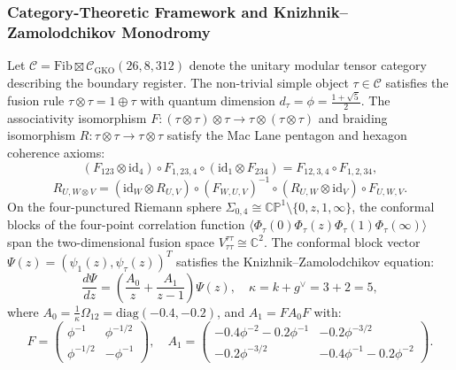 \documentclass[11pt,onecolumn]{article}
\begin{document}
\subsubsection{Category-Theoretic Framework and Knizhnik--Zamolodchikov Monodromy}
Let $\mathcal{C} = \text{Fib} \boxtimes \mathcal{C}_{\text{GKO}}(26, 8, 312)$ denote the unitary modular tensor category describing the boundary register. The non-trivial simple object $\tau \in \mathcal{C}$ satisfies the fusion rule $\tau \otimes \tau = 1 \oplus \tau$ with quantum dimension $d_\tau = \phi = \frac{1+\sqrt{5}}{2}$. The associativity isomorphism $F: (\tau \otimes \tau) \otimes \tau \to \tau \otimes (\tau \otimes \tau)$ and braiding isomorphism $R: \tau \otimes \tau \to \tau \otimes \tau$ satisfy the Mac Lane pentagon and hexagon coherence axioms:
\begin{equation}
(F_{123} \otimes \text{id}_4) \circ F_{1,23,4} \circ (\text{id}_1 \otimes F_{234}) = F_{12,3,4} \circ F_{1,2,34},
\label{eq:pentagon_axiom}
\end{equation}
\begin{equation}
R_{U, W \otimes V} = (\text{id}_W \otimes R_{U,V}) \circ (F_{W,U,V})^{-1} \circ (R_{U,W} \otimes \text{id}_V) \circ F_{U,W,V}.
\label{eq:hexagon_axiom}
\end{equation}
On the four-punctured Riemann sphere $\Sigma_{0,4} \cong \mathbb{CP}^1 \setminus \{0, z, 1, \infty\}$, the conformal blocks of the four-point correlation function $\langle \Phi_\tau(0) \Phi_\tau(z) \Phi_\tau(1) \Phi_\tau(\infty) \rangle$ span the two-dimensional fusion space $V_{\tau\tau}^{\tau\tau} \cong \mathbb{C}^2$. The conformal block vector $\Psi(z) = (\psi_1(z), \psi_\tau(z))^T$ satisfies the Knizhnik--Zamolodchikov equation:
\begin{equation}
\frac{d\Psi}{dz} = \left( \frac{A_0}{z} + \frac{A_1}{z - 1} \right) \Psi(z), \quad \kappa = k + g^\vee = 3 + 2 = 5,
\label{eq:kz_four_point}
\end{equation}
where $A_0 = \frac{1}{\kappa} \Omega_{12} = \mathrm{diag}(-0.4, -0.2)$, and $A_1 = F A_0 F$ with:
\begin{equation}
F = \begin{pmatrix} \phi^{-1} & \phi^{-1/2} \\ \phi^{-1/2} & -\phi^{-1} \end{pmatrix}, \quad
A_1 = \begin{pmatrix} -0.4\phi^{-2} - 0.2\phi^{-1} & -0.2\phi^{-3/2} \\ -0.2\phi^{-3/2} & -0.4\phi^{-1} - 0.2\phi^{-2} \end{pmatrix}.
\end{equation}
\end{document}
